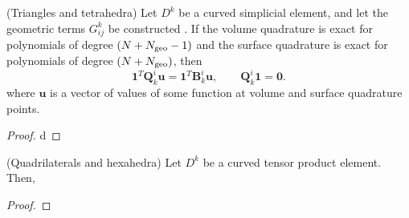 \documentclass[review]{siamart0216}
\theoremstyle{assumption}
\newcommand{\note}[1]{{\color{blue}{#1}}}
\begin{document}
\begin{lemma}{(Triangles and tetrahedra)}
Let $D^k$ be a curved simplicial element, and let the geometric terms $G^k_{ij}$ be constructed .  If the volume quadrature is exact for polynomials of degree $(N+N_{\rm geo}-1)$ and the surface quadrature is exact for polynomials of degree $(N+N_{\rm geo})$, then 
\[
\bm{1}^T\bm{Q}^i_k\bm{u} = \bm{1}^T\bm{B}^i_k\bm{u}, \qquad \bm{Q}^i_k\bm{1} = \bm{0}.
\]
where $\bm{u}$ is a vector of values of some function at volume and surface quadrature points. 
\end{lemma}
\begin{proof}
d
\end{proof}


\begin{lemma}{(Quadrilaterals and hexahedra)}
Let $D^k$ be a curved tensor product element.  Then, 
\end{lemma}
\begin{proof}
\note{Proof relies on two facts: that geometric terms are products of }
\end{proof}
\end{document}
